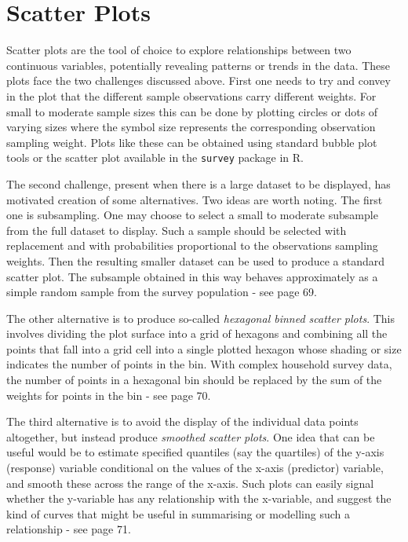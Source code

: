\documentclass[
  12pt,
]{book}
\begin{document}
\section{Scatter Plots}\label{scatter-plots}

Scatter plots are the tool of choice to explore relationships between two continuous variables, potentially revealing patterns or trends in the data. These plots face the two challenges discussed above. First one needs to try and convey in the plot that the different sample observations carry different weights. For small to moderate sample sizes this can be done by plotting circles or dots of varying sizes where the symbol size represents the corresponding observation sampling weight. Plots like these can be obtained using standard bubble plot tools or the scatter plot available in the \texttt{survey} package in R.

The second challenge, present when there is a large dataset to be displayed, has motivated creation of some alternatives. Two ideas are worth noting. The first one is subsampling. One may choose to select a small to moderate subsample from the full dataset to display. Such a sample should be selected with replacement and with probabilities proportional to the observations sampling weights. Then the resulting smaller dataset can be used to produce a standard scatter plot. The subsample obtained in this way behaves approximately as a simple random sample from the survey population - see \citet{Lumley2010} page 69.

The other alternative is to produce so-called \emph{hexagonal binned scatter plots}. This involves dividing the plot surface into a grid of hexagons and combining all the points that fall into a grid cell into a single plotted hexagon whose shading or size indicates the number of points in the bin. With complex household survey data, the number of points in a hexagonal bin should be replaced by the sum of the weights for points in the bin - see \citet{Lumley2010} page 70.

The third alternative is to avoid the display of the individual data points altogether, but instead produce \emph{smoothed scatter plots}. One idea that can be useful would be to estimate specified quantiles (say the quartiles) of the y-axis (response) variable conditional on the values of the x-axis (predictor) variable, and smooth these across the range of the x-axis. Such plots can easily signal whether the y-variable has any relationship with the x-variable, and suggest the kind of curves that might be useful in summarising or modelling such a relationship - see \citet{Lumley2010} page 71.
\end{document}
